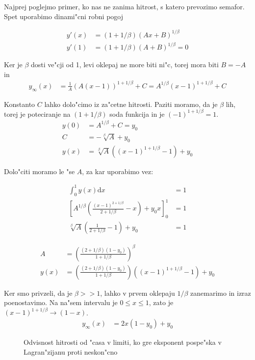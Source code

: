 \documentclass[12pt]{article}
\newcommand{\dd}{\mathrm{d}}
\begin{document}
Najprej poglejmo primer, ko nas ne zanima hitrost, s katero prevozimo semafor. Spet uporabimo dinami"cni robni pogoj

\begin{align}
  y'(x) &= (1+1/\beta) (Ax+B)^{1/\beta} \\
  y'(1) &= (1+1/\beta) (A+B)^{1/\beta} = 0 
\end{align}

Ker je $\beta$ dosti ve"cji od 1, levi oklepaj ne more biti ni"c, torej mora biti $B=-A$ in
\begin{align}
  y_\infty(x) &= \frac{1}{A}\left(A(x-1)\right)^{1+1/\beta} + C = A^{1/\beta} (x-1)^{1+1/\beta} + C
\end{align}

Konstanto $C$ lahko dolo"cimo iz za"cetne hitrosti. Paziti moramo, da je $\beta$ lih, torej je poteciranje na $(1+1/\beta)$ soda funkcija in je $(-1)^{1+1/\beta} = 1$.
\begin{align}
  y(0) &= A^{1/\beta} + C = y_0 \\
  C &= -\sqrt[\beta]{A} + y_0 \\
  y(x) &= \sqrt[\beta]{A} ( (x-1)^{1+1/\beta} - 1 ) + y_0
\end{align}


Dolo"citi moramo le "se $A$, za kar uporabimo vez:

\begin{align}
  \int_0^1 y(x) \dd x &= 1 \\
  \left[A^{1/\beta} \left(\frac{(x-1)^{2+1/\beta}}{2+1/\beta} - x\right) + y_0 x\right]_0^1 &= 1 \\
  \sqrt[\beta]{A}\left(\frac{1}{2+1/\beta}-1\right) + y_0 &= 1
\end{align}

\begin{align}
  A &= \left( \frac{(2+1/\beta)(1-y_0)}{1+1/\beta} \right)^\beta \\
  y(x) &= \left( \frac{(2+1/\beta)(1-y_0)}{1+1/\beta} \right) \left( (x-1)^{1+1/\beta} - 1 \right) + y_0
\end{align}

Ker smo privzeli, da je $\beta >> 1$, lahko v prvem oklepaju $1/\beta$ zanemarimo in izraz poenostavimo. Na na"sem intervalu je $0\leq x \leq 1$, zato je $(x-1)^{1+1/\beta} \to (1-x)$. 
\begin{align}
 y_\infty(x) &= 2x(1-y_0) + y_0 
\end{align}

\begin{figure}

\caption{Odvisnost hitrosti od "casa v limiti, ko gre eksponent pospe"ska v Lagran"zijanu proti neskon"cno} 
\label{fig:eksponent}
\end{figure}
\end{document}
